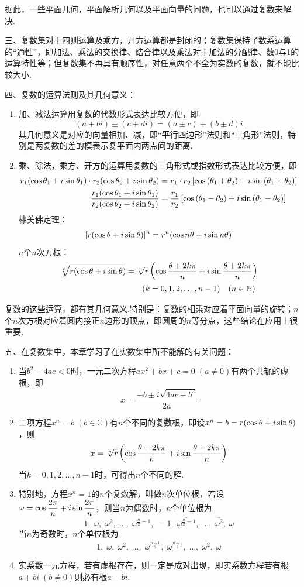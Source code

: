 据此，一些平面几何，平面解析几何以及平面向量的问题，也可以通过复数来解决.

三、复数集对于四则运算及乘方，开方运算都是封闭的；复数集保持了数系运算的“通性”，即加法、乘法的交换律、结合律以及乘法对于加法的分配律、数0与1的运算特性等；但复数集不再具有顺序性，对任意两个不全为实数的复数，就不能比较大小.

四、复数的运算法则及其几何意义：
\begin{enumerate}
    \item 加、减法运算用复数的代数形式表达比较方便，即
    \[(a+bi)\pm (c+di)=(a\pm c)+(b\pm d)i\]
    其几何意义是对应的向量相加、减，即“平行四边形”法则和“三角形”法则，特别是两复数的差的模表示复平面内两点间的距离.
    \item 乘、除法，乘方、开方的运算用复数的三角形式或指数形式表达比较方便，即
\[\begin{split}
    r_1(\cos{\theta_1}+i\sin{\theta_1})\cdot r_2(\cos{\theta_2}+i\sin{\theta_2})&=r_1\cdot r_2\left[\cos\left(\theta_1+\theta_2\right)+i\sin\left(\theta_1+\theta_2\right)\right]\\
\dfrac{r_1(\cos{\theta_1}+i\sin{\theta_1})}{r_2(\cos{\theta_2}+i\sin{\theta_2})}&=\dfrac{r_1}{r_2}\left[\cos\left(\theta_1-\theta_2\right)+i\sin\left(\theta_1-\theta_2\right)\right]
\end{split}\]
棣美佛定理：
\[[r(\cos{\theta}+i\sin{\theta})]^n=r^n(\cos{n\theta}+i\sin{n\theta})\]
$n$个$n$次方根：
\[\begin{split}
\sqrt[n]{r(\cos{\theta}+i\sin{\theta})}&=\sqrt[n]{r}\left(\cos{\dfrac{\theta+2k\pi}{n}}+i\sin{\dfrac{\theta+2k\pi}{n}}\right)\\
&\qquad (k=0,1,2,\ldots,n-1)\quad (n\in\mathbb{N})    
\end{split} \]
\end{enumerate}

复数的这些运算，都有其几何意义.特别是：复数的相乘对应着平面向量的旋转；$n$个$n$次方根对应着圆内接正$n$边形的顶点，即圆周的$n$等分点，这些结论在应用上很重要.

五、在复数集中，本章学习了在实数集中所不能解的有关问题：
\begin{enumerate}
    \item 当$b^2-4ac<0$时，一元二次方程$ax^2+bx+c=0\; (a\ne 0)$有两个共轭的虚根，即
\[x=\frac{-b\pm i\sqrt{4ac-b^2}}{2a}\]
\item 二项方程$x^n=b\; (b\in\mathbb{C})$有$n$个不同的复数根，即设$x^n=b=r(\cos{\theta}+i\sin{\theta})$，则
\[x=\sqrt[n]{r}\left(\cos{\dfrac{\theta+2k\pi}{n}}+i\sin{\dfrac{\theta+2k\pi}{n}}\right)\]
当$k=0,1,2,\ldots,n-1$时，可得出$n$个不同的解.

\item 特别地，方程$x^n=1$的$n$个复数解，叫做$n$次单位根，若设$\omega=\cos{\dfrac{2\pi}{n}}+i\sin{\dfrac{2\pi}{n}}$，则当$n$为偶数时，$n$个单位根为
\[1,\; \omega,\; \omega^2,\;\ldots,\;  \omega^{\tfrac{n}{2}-1},\;-1,\;  \overline{\omega^{\tfrac{n}{2}-1}},\; \ldots, \;  \overline{\omega^{2}},\; \overline{\omega}\]
当$n$为奇数时，$n$个单位根为
\[1,\; \omega,\; \omega^2,\;\ldots,\;  \omega^{\tfrac{n-1}{2}},\;  \overline{\omega^{\tfrac{n-1}{2}}},\; \ldots, \;  \overline{\omega^{2}},\; \overline{\omega}\]

\item 实系数一元方程，若有虚根存在，则一定是成对出现，即实系数方程若有根$a+bi\;(b\ne 0)$则必有根$a-bi$.
\end{enumerate}

